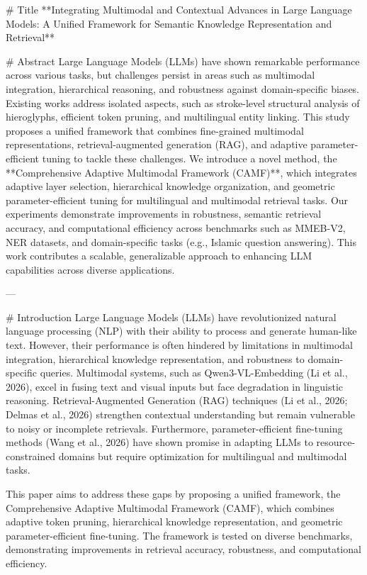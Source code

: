 # Title
**Integrating Multimodal and Contextual Advances in Large Language Models: A Unified Framework for Semantic Knowledge Representation and Retrieval**

# Abstract
Large Language Models (LLMs) have shown remarkable performance across various tasks, but challenges persist in areas such as multimodal integration, hierarchical reasoning, and robustness against domain-specific biases. Existing works address isolated aspects, such as stroke-level structural analysis of hieroglyphs, efficient token pruning, and multilingual entity linking. This study proposes a unified framework that combines fine-grained multimodal representations, retrieval-augmented generation (RAG), and adaptive parameter-efficient tuning to tackle these challenges. We introduce a novel method, the **Comprehensive Adaptive Multimodal Framework (CAMF)**, which integrates adaptive layer selection, hierarchical knowledge organization, and geometric parameter-efficient tuning for multilingual and multimodal retrieval tasks. Our experiments demonstrate improvements in robustness, semantic retrieval accuracy, and computational efficiency across benchmarks such as MMEB-V2, NER datasets, and domain-specific tasks (e.g., Islamic question answering). This work contributes a scalable, generalizable approach to enhancing LLM capabilities across diverse applications.

---

# Introduction
Large Language Models (LLMs) have revolutionized natural language processing (NLP) with their ability to process and generate human-like text. However, their performance is often hindered by limitations in multimodal integration, hierarchical knowledge representation, and robustness to domain-specific queries. Multimodal systems, such as Qwen3-VL-Embedding (Li et al., 2026), excel in fusing text and visual inputs but face degradation in linguistic reasoning. Retrieval-Augmented Generation (RAG) techniques (Li et al., 2026; Delmas et al., 2026) strengthen contextual understanding but remain vulnerable to noisy or incomplete retrievals. Furthermore, parameter-efficient fine-tuning methods (Wang et al., 2026) have shown promise in adapting LLMs to resource-constrained domains but require optimization for multilingual and multimodal tasks.

This paper aims to address these gaps by proposing a unified framework, the Comprehensive Adaptive Multimodal Framework (CAMF), which combines adaptive token pruning, hierarchical knowledge representation, and geometric parameter-efficient fine-tuning. The framework is tested on diverse benchmarks, demonstrating improvements in retrieval accuracy, robustness, and computational efficiency.

